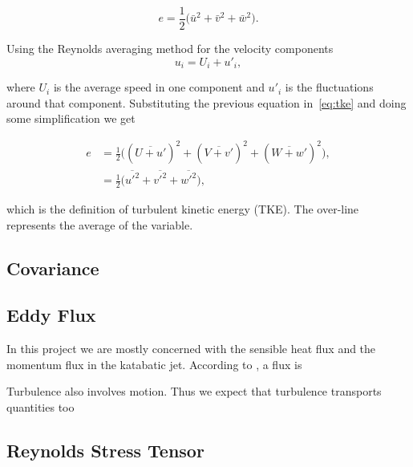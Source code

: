 \documentclass[a4paper,12pt]{article}
\begin{document}
\begin{equation}
    e = \frac{1}{2} \big(\bar{u}^2 + \bar{v}^2 + \bar{w}^2\big). 
    \label{eq:tke}
\end{equation}

 Using the Reynolds averaging method for the velocity components
\begin{equation}
   u_i = U_i + u'_i,
   \label{eq:Re_avg}
\end{equation}


\noindent where $U_i$ is the average speed in one component and $u'_i$ is the fluctuations around that component. Substituting the previous equation in~\ref{eq:tke} and doing some simplification we get

\begin{subequations}
  \begin{align}
    e &= \frac{1}{2} \big((\overline{U + u'})^2 + (\overline{V + v'})^2 + (\overline{W + w'})^2 \big), \\
    &= \frac{1}{2} \big(\overline{u'^2} + \overline{v'^2} + \overline{w'^2}\big),
  \end{align}
  \label{eq:tke_2}
\end{subequations}

\noindent which is the definition of turbulent kinetic energy (TKE). The over-line represents the average of the variable. 

\subsection{Covariance}


\subsection{Eddy Flux}
In this project we are mostly concerned with the sensible heat flux and the momentum flux in the katabatic jet. According to \cite{stull2012introduction}, a flux is 

Turbulence also involves motion. Thus we expect that turbulence transports
quantities too

\subsection{Reynolds Stress Tensor}
\end{document}
